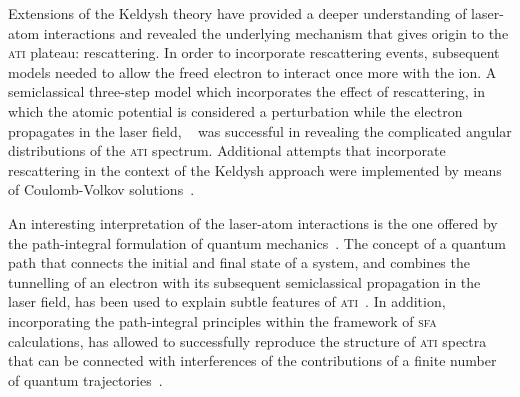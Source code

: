Extensions of the Keldysh theory have provided a deeper understanding
of laser-atom interactions and revealed the underlying mechanism that
gives origin to the \textsc{ati} plateau: rescattering. In order to
incorporate rescattering events, subsequent models needed to allow the
freed electron to interact once more with the ion. A semiclassical
three-step model which incorporates the effect of rescattering, in
which the atomic potential is considered a perturbation while the
electron propagates in the laser field,
~\cite{Becker_rescattering1994,Becker_1994plateau_classical} was
successful in revealing the complicated angular distributions of the
\textsc{ati} spectrum. Additional attempts that incorporate
rescattering in the context of the Keldysh approach were implemented
by means of Coulomb-Volkov solutions~\cite{Kaminski_1997}.


An interesting interpretation of the laser-atom interactions is the
one offered by the path-integral formulation of quantum
mechanics~\cite{RevModPhysFeynman}. The concept of a quantum path that
connects the initial and final state of a system, and combines the
tunnelling of an electron with its subsequent semiclassical propagation
in the laser field, has been used to explain subtle features of
\textsc{ati}~\cite{LewScience2001}. In addition, incorporating the
path-integral principles within the framework of \textsc{sfa}
calculations, has allowed to successfully reproduce the structure of
\textsc{ati} spectra that can be connected with interferences of the
contributions of a finite number of quantum
trajectories~\cite{KopoldOptComm2000}.




